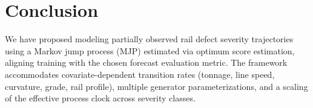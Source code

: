 %
%

\section{Conclusion} \label{sec:conclusion}
We have proposed modeling partially observed rail defect severity trajectories using a Markov jump process (MJP) estimated via optimum score estimation, aligning training with the chosen forecast evaluation metric. The framework accommodates covariate-dependent transition rates (tonnage, line speed, curvature, grade, rail profile), multiple generator parameterizations, and a scaling of the effective process clock across severity classes.

